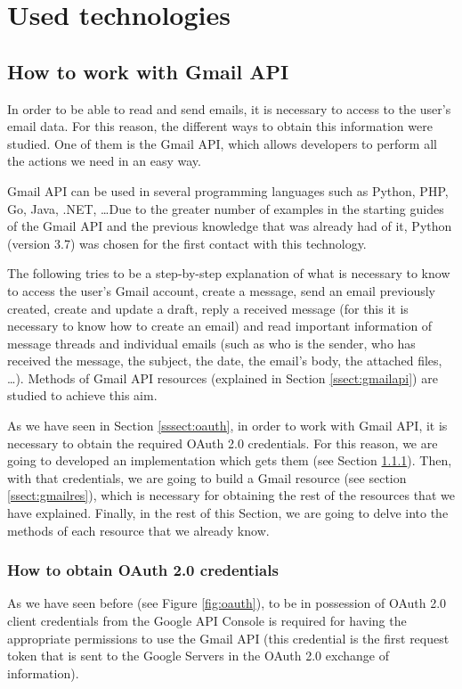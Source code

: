 \chapter{Used technologies}
\label{cap:usedtech}

\section{How to work with Gmail API}\label{sect:gmailapitech}
In order to be able to read and send emails, it is necessary to access to the user's email data. For this reason, the different ways to obtain this information were studied. One of them is the Gmail API, which allows developers to perform all the actions we need in an easy way.

Gmail API can be used in several programming languages such as Python, PHP, Go, Java, .NET, \ldots\phantom{ }Due to the greater number of examples in the starting guides of the Gmail API \citep{gmailAPI} and the previous knowledge that was already had of it, Python (version 3.7) was chosen for the first contact with this technology.

The following tries to be a step-by-step explanation of what is necessary to know to access the user's Gmail account, create a message, send an email previously created, create and update a draft, reply a received message (for this it is necessary to know how to create an email) and read important information of message threads and individual emails (such as who is the sender, who has received the message, the subject, the date, the email's body, the attached files, \ldots). Methods of Gmail API resources (explained in Section \ref{ssect:gmailapi}) are studied to achieve this aim.

As we have seen in Section \ref{sssect:oauth}, in order to work with Gmail API, it is necessary to obtain the required OAuth 2.0 credentials. For this reason, we are going to developed an implementation which gets them (see Section \ref{ssect:oauth}). Then, with that credentials, we are going to build a Gmail resource (see section \ref{ssect:gmailres}), which is necessary for obtaining the rest of the resources that we have explained. Finally, in the rest of this Section, we are going to delve into the methods of each resource that we already know.

\subsection{How to obtain OAuth 2.0 credentials}\label{ssect:oauth}
As we have seen before (see Figure \ref{fig:oauth}), to be in possession of OAuth 2.0 client credentials from the Google API Console is required for having the appropriate permissions to use the Gmail API (this credential is the first request token that is sent to the Google Servers in the OAuth 2.0 exchange of information).

